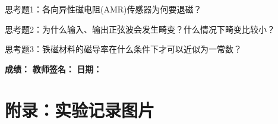 \documentclass[12pt,a4paper]{article}
\newcommand{\recordblank}[1]{\par\vspace*{#1}\par}
\begin{document}
\begin{questionbox}
思考题1：各向异性磁电阻(AMR)传感器为何要退磁？
\end{questionbox}
\recordblank{4cm}
\begin{questionbox}
思考题2：为什么输入、输出正弦波会发生畸变？什么情况下畸变比较小？
\end{questionbox}
\recordblank{4cm}
\begin{questionbox}
思考题3：铁磁材料的磁导率在什么条件下才可以近似为一常数？
\end{questionbox}
\recordblank{4cm}
\noindent\textbf{成绩：}\underline{\hspace{3cm}} \hspace{1.5cm} \textbf{教师签名：}\underline{\hspace{3cm}} \hspace{1.5cm} \textbf{日期：}\underline{\hspace{3cm}}

\section*{附录：实验记录图片}


\recordblank{7cm}


\recordblank{7cm}


\recordblank{7cm}


\recordblank{7cm}
\end{document}
